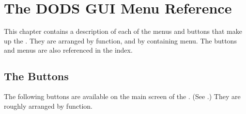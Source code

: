 %
%
%

\chapter{The DODS GUI Menu Reference}
\label{gui,ref}

This chapter contains a description of each of the menus and
buttons that make up the \GUI. They are arranged by function, and by
containing menu.  The buttons and menus are also referenced in the
index. 


\newcommand{\button}[1]{\item[\but{#1}]\label{gui,bref,#1}%
                        \indc{#1!button}\indc{button!#1}}
\newcommand{\menudesc}[1]{\subsection{#1}\label{gui,mref,#1}%
                          \indc{#1!menu}\indc{menu!#1}}
\newcommand{\submenudesc}[1]{\subsubsection{#1}\label{gui,smref,#1}%
                          \indc{#1!menu}\indc{menu!#1}}

\section{The Buttons}

The following buttons are available on the main screen of the \GUI .
(See .) They are roughly arranged by
function.

